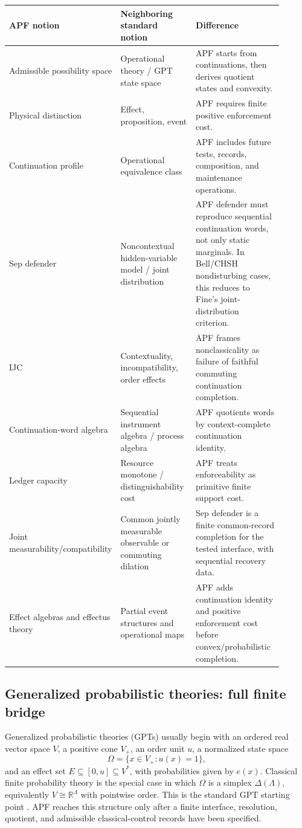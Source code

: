 \documentclass[11pt]{article}
\newcommand{\R}{\mathbb R}
\begin{document}
\begin{center}
\begin{longtable}{@{}p{0.25\linewidth}p{0.30\linewidth}p{0.35\linewidth}@{}}
\toprule
APF notion & Neighboring standard notion & Difference \\
\midrule
Admissible possibility space & Operational theory / GPT state space & APF starts from continuations, then derives quotient states and convexity. \\
Physical distinction & Effect, proposition, event & APF requires finite positive enforcement cost. \\
Continuation profile & Operational equivalence class & APF includes future tests, records, composition, and maintenance operations. \\
Sep defender & Noncontextual hidden-variable model / joint distribution & APF defender must reproduce sequential continuation words, not only static marginals.  In Bell/CHSH nondisturbing cases, this reduces to Fine's joint-distribution criterion. \\
IJC & Contextuality, incompatibility, order effects & APF frames nonclassicality as failure of faithful commuting continuation completion. \\
Continuation-word algebra & Sequential instrument algebra / process algebra & APF quotients words by context-complete continuation identity. \\
Ledger capacity & Resource monotone / distinguishability cost & APF treats enforceability as primitive finite support cost. \\
Joint measurability/compatibility & Common jointly measurable observable or commuting dilation & Sep defender is a finite common-record completion for the tested interface, with sequential recovery data. \\
Effect algebras and effectus theory & Partial event structures and operational maps & APF adds continuation identity and positive enforcement cost before convex/probabilistic completion. \\
\bottomrule
\end{longtable}
\end{center}


\subsection*{Generalized probabilistic theories: full finite bridge}
\label{subsec:gpt-full-bridge}

Generalized probabilistic theories (GPTs) usually begin with an ordered real vector space \(V\), a positive cone \(V_+\), an order unit \(u\), a normalized state space
\[
  \Omega=\{x\in V_+ : u(x)=1\},
\]
and an effect set \(E\subseteq [0,u]\subseteq V^*\), with probabilities given by \(e(x)\).  Classical finite probability theory is the special case in which \(\Omega\) is a simplex \(\Delta(\Lambda)\), equivalently \(V\cong\R^\Lambda\) with pointwise order.  This is the standard GPT starting point \cite{Hardy2001,Barrett2007,ChiribellaPurification2010,Chiribella2011}.  APF reaches this structure only after a finite interface, resolution, quotient, and admissible classical-control records have been specified.
\end{document}
